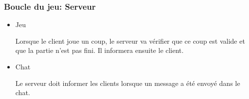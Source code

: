 \subsubsection{Boucle du jeu: Serveur}
\begin{itemize}
    \item Jeu

        Lorsque le client joue un coup, le serveur va vérifier que ce coup est valide et que la partie n'est pas fini. Il informera ensuite
        le client.

    \item Chat
    
        Le serveur doit informer les clients lorsque un message a été envoyé dans le chat.


\end{itemize}
